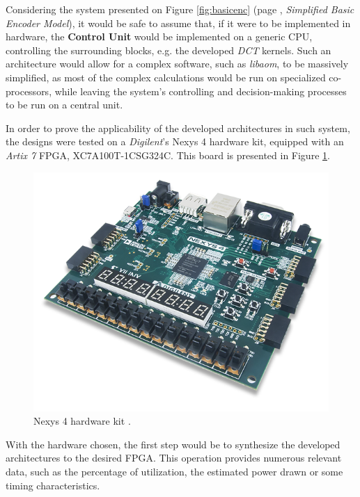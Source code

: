 Considering the system presented on Figure \ref{fig:basicenc} (page \pageref{fig:basicenc}, \emph{Simplified Basic Encoder Model}), it would be safe to assume that, if it were to be implemented in hardware, the \textbf{Control Unit} would be implemented on a generic CPU, controlling the surrounding blocks, e.g. the developed \emph{DCT} kernels. Such an architecture would allow for a complex software, such as \emph{libaom}, to be massively simplified, as most of the complex calculations would be run on specialized co-processors, while leaving the system's controlling and decision-making processes to be run on a central unit.

In order to prove the applicability of the developed architectures in such system, the designs were tested on a \emph{Digilent}'s Nexys 4 hardware kit, equipped with an \emph{Artix 7} FPGA, XC7A100T-1CSG324C. This board is presented in Figure \ref{fig:nexys4}.

\begin{figure}[!htb]
    \centering
    \includegraphics[width=\figwidth]{Sections/4DevelopedArchitecture/Figures/nexys-4-0.png}
    \caption[Nexys 4 hardware kit.]{Nexys 4 hardware kit \cite{NexysArtix7FPGA}.}
    \label{fig:nexys4}
\end{figure}

With the hardware chosen, the first step would be to synthesize the developed architectures to the desired FPGA. This operation provides numerous relevant data, such as the percentage of utilization, the estimated power drawn or some timing characteristics. 

